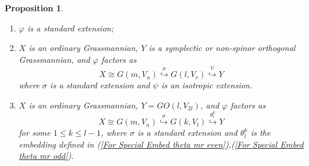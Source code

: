 \documentclass[12pt]{amsart}
\def\hw  {\hookrightarrow}
\newtheorem{prop}[theorem]{Proposition}
\begin{document}
\begin{prop}
\begin{enumerate}
\begin{enumerate}
\item[{\rm (ii.1)}] $\varphi$ is a standard extension;
\item[{\rm (ii.2)}] $X$ is an ordinary Grassmannian, $Y$ is a symplectic or non-spinor orthogonal Grassmannian, and $\varphi$ factors as
$$
X\cong G(m,V_n) \stackrel{\sigma}{\hw} G(l,V_r) \stackrel{\psi}{\hw} Y
$$
where $\sigma$ is a standard extension and $\psi$ is an isotropic extension.
\item[{\rm (ii.3)}] $X$ is an ordinary Grassmannian, $Y=GO(l,V_{2l})$, and $\varphi$ factors as
$$
X\cong G(m,V_n) \stackrel{\sigma}{\hw} G(k,V_l) \stackrel{\theta_l^k}{\hw} Y
$$
for some $1\leq k\leq l-1$, where $\sigma$ is a standard extension and $\theta_l^k$ is the embedding defined in (\ref{For Special Embed theta mr even}),(\ref{For Special Embed theta mr odd}).
\end{enumerate}
\end{enumerate}
\end{prop}
\end{document}
